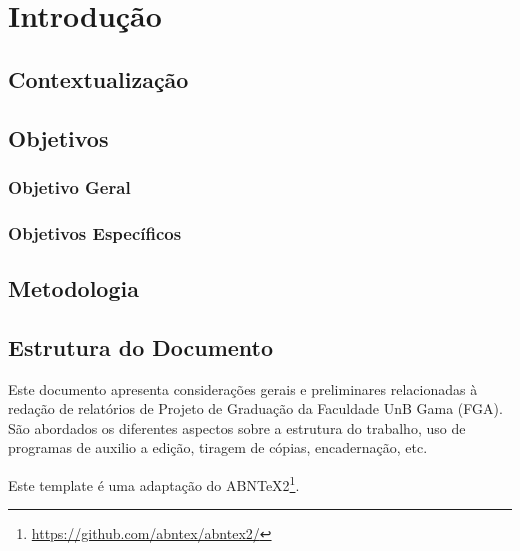 \chapter*[Introdução]{Introdução}

\section{Contextualização}

\section{Objetivos}

\subsection{Objetivo Geral}
\subsection{Objetivos Específicos}

\section{Metodologia}
\section{Estrutura do Documento}

Este documento apresenta considerações gerais e preliminares relacionadas
à redação de relatórios de Projeto de Graduação da Faculdade UnB Gama
(FGA). São abordados os diferentes aspectos sobre a estrutura do trabalho,
uso de programas de auxilio a edição, tiragem de cópias, encadernação, etc.

Este template é uma adaptação do ABNTeX2\footnote{\url{https://github.com/abntex/abntex2/}}.
